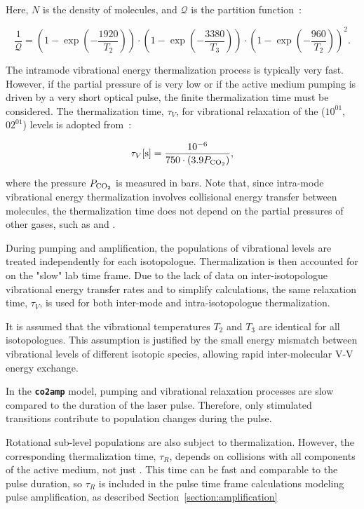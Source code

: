Here, $N$ is the density of  molecules, and $\mathcal{Q}$ is the partition function~\cite{Witteman-1987}:

\begin{equation}
\frac{1}{\mathcal{Q}} = \left(1-\exp\left(-\frac{1920}{T_2}\right)\right) \cdot \left(1-\exp\left(-\frac{3380}{T_3}\right)\right) \cdot \left(1-\exp\left(-\frac{960}{T_2}\right)\right)^2.
\end{equation}

The intramode vibrational energy thermalization process is typically very fast. However, if the partial pressure of  is very low or if the active medium pumping is driven by a very short optical pulse, the finite thermalization time must be considered. The thermalization time, $\tau_V$, for vibrational relaxation of the ($10^01$, $02^01$) levels is adopted from~\cite{Finzi-1975}:

\begin{equation}\label{eq:tauV}
\tau_V [\text{s}] = \frac{10^{-6}}{750 \cdot (3.9 P_{\ce{CO2}})},
\end{equation}

where the pressure $P_{\ce{CO2}}$ is measured in bars. Note that, since intra-mode vibrational energy thermalization involves collisional energy transfer between  molecules, the thermalization time does not depend on the partial pressures of other gases, such as  and .

During pumping and amplification, the populations of vibrational levels are treated independently for each  isotopologue. Thermalization is then accounted for on the "slow" lab time frame. Due to the lack of data on inter-isotopologue vibrational energy transfer rates and to simplify calculations, the same relaxation time, $\tau_V$, is used for both inter-mode and intra-isotopologue thermalization.

It is assumed that the vibrational temperatures $T_2$ and $T_3$ are identical for all  isotopologues. This assumption is justified by the small energy mismatch between vibrational levels of different isotopic species, allowing rapid inter-molecular V-V energy exchange.

In the \textbf{\texttt{co2amp}} model, pumping and vibrational relaxation processes are slow compared to the duration of the laser pulse. Therefore, only stimulated transitions contribute to population changes during the pulse.

Rotational sub-level populations are also subject to thermalization. However, the corresponding thermalization time, $\tau_R$, depends on collisions with all components of the active medium, not just . This time can be fast and comparable to the pulse duration, so $\tau_R$ is included in the pulse time frame calculations modeling pulse amplification, as described Section~\ref{section:amplification}





